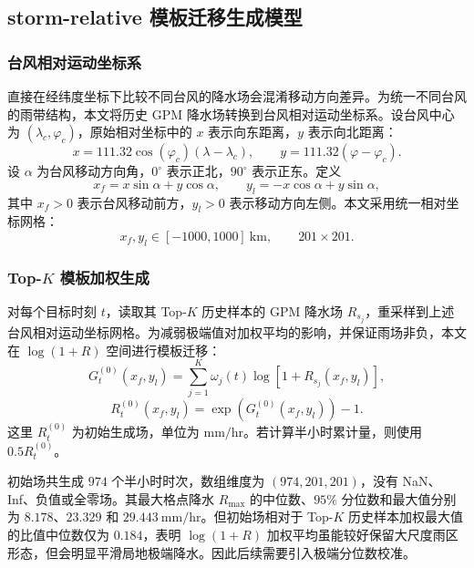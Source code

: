 \documentclass[UTF8,a4paper,zihao=5,fontset=fandol]{ctexart}
\numberwithin{equation}{section}
\numberwithin{figure}{section}
\numberwithin{table}{section}
\begin{document}
\subsection{\texorpdfstring{storm-relative}{storm-relative} 模板迁移生成模型}

\subsubsection{台风相对运动坐标系}

直接在经纬度坐标下比较不同台风的降水场会混淆移动方向差异。为统一不同台风的雨带结构，本文将历史 GPM 降水场转换到台风相对运动坐标系。设台风中心为 $(\lambda_c,\varphi_c)$，原始相对坐标中的 $x$ 表示向东距离，$y$ 表示向北距离：
\begin{equation}
x=111.32\cos(\varphi_c)(\lambda-\lambda_c),\qquad
y=111.32(\varphi-\varphi_c).
\end{equation}
设 $\alpha$ 为台风移动方向角，$0^\circ$ 表示正北，$90^\circ$ 表示正东。定义
\begin{equation}
x_f=x\sin\alpha+y\cos\alpha,\qquad
y_l=-x\cos\alpha+y\sin\alpha,
\end{equation}
其中 $x_f>0$ 表示台风移动前方，$y_l>0$ 表示移动方向左侧。本文采用统一相对坐标网格：
\begin{equation}
x_f,y_l\in[-1000,1000]\ \mathrm{km},\qquad
201\times 201.
\end{equation}

\subsubsection{Top-$K$ 模板加权生成}

对每个目标时刻 $t$，读取其 Top-$K$ 历史样本的 GPM 降水场 $R_{s_j}$，重采样到上述台风相对运动坐标网格。为减弱极端值对加权平均的影响，并保证雨场非负，本文在 $\log(1+R)$ 空间进行模板迁移：
\begin{equation}
G_t^{(0)}(x_f,y_l)
=
\sum_{j=1}^{K}\omega_j(t)\log\left[1+R_{s_j}(x_f,y_l)\right],
\end{equation}
\begin{equation}
R_t^{(0)}(x_f,y_l)
=
\exp\left(G_t^{(0)}(x_f,y_l)\right)-1.
\end{equation}
这里 $R_t^{(0)}$ 为初始生成场，单位为 \(\mathrm{mm/hr}\)。若计算半小时累计量，则使用 $0.5R_t^{(0)}$。

初始场共生成 $974$ 个半小时时次，数组维度为 $(974,201,201)$，没有 NaN、Inf、负值或全零场。其最大格点降水 $R_{\max}$ 的中位数、$95\%$ 分位数和最大值分别为 $8.178$、$23.329$ 和 $29.443\ \mathrm{mm/hr}$。但初始场相对于 Top-$K$ 历史样本加权最大值的比值中位数仅为 $0.184$，表明 $\log(1+R)$ 加权平均虽能较好保留大尺度雨区形态，但会明显平滑局地极端降水。因此后续需要引入极端分位数校准。
\end{document}

